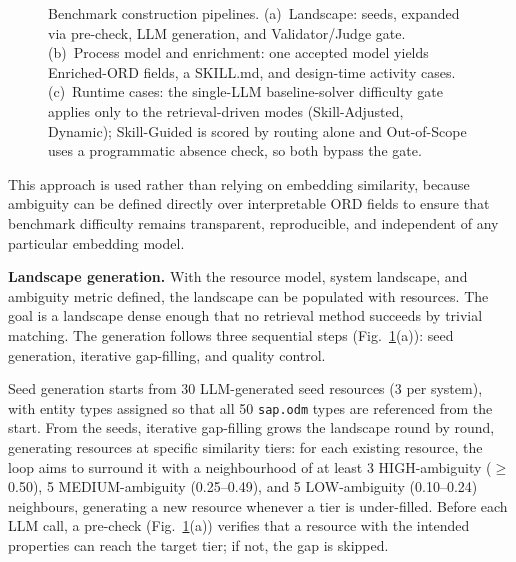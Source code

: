 \documentclass[10pt,twocolumn]{article}
\begin{document}
\begin{figure}[t]
{}%
  \caption{Benchmark construction pipelines. (a)~Landscape: seeds, expanded via pre-check, LLM generation, and Validator/Judge gate. (b)~Process model and enrichment: one accepted model yields Enriched-ORD fields, a SKILL.md, and design-time activity cases. (c)~Runtime cases: the single-LLM baseline-solver difficulty gate applies only to the retrieval-driven modes (Skill-Adjusted, Dynamic); Skill-Guided is scored by routing alone and Out-of-Scope uses a programmatic absence check, so both bypass the gate.}
  \label{fig:pipelines}
  \end{figure}
  
This approach is used rather than relying on embedding similarity, because ambiguity can be defined directly over interpretable ORD fields to ensure that benchmark difficulty remains transparent, reproducible, and independent of any particular embedding model. 

\textbf{Landscape generation.} With the resource model, system landscape, and ambiguity metric defined, the landscape can be populated with resources. The goal is a landscape dense enough that no retrieval method succeeds by trivial matching. The generation follows three sequential steps (Fig.~\ref{fig:pipelines}(a)): seed generation, iterative gap-filling, and quality control.

Seed generation starts from 30 LLM-generated seed resources (3 per system), with entity types assigned so that all 50 \texttt{sap.odm} types are referenced from the start. From the seeds, iterative gap-filling grows the landscape round by round, generating resources at specific similarity tiers: for each existing resource, the loop aims to surround it with a neighbourhood of at least 3 HIGH-ambiguity ($\geq$0.50), 5 MEDIUM-ambiguity (0.25--0.49), and 5 LOW-ambiguity (0.10--0.24) neighbours, generating a new resource whenever a tier is under-filled. Before each LLM call, a pre-check (Fig.~\ref{fig:pipelines}(a)) verifies that a resource with the intended properties can reach the target tier; if not, the gap is skipped.
\end{document}
